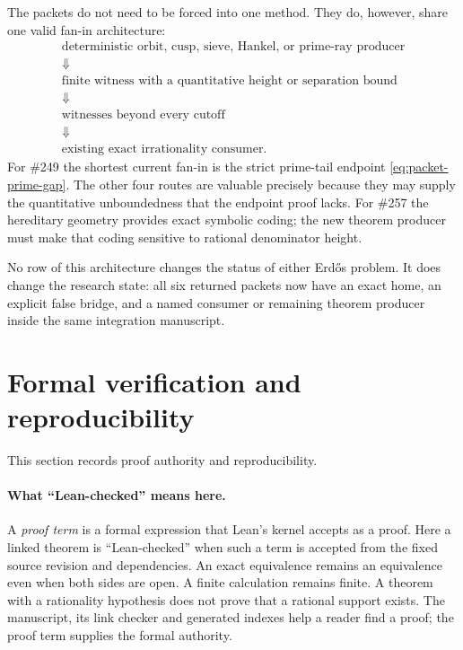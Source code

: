 \documentclass[11pt]{article}
\theoremstyle{definition}
\theoremstyle{remark}
\begin{document}
The packets do not need to be forced into one method.  They do, however, share
one valid fan-in architecture:
\[
 \begin{array}{c}
 \text{deterministic orbit, cusp, sieve, Hankel, or prime-ray producer}
 \\
 \Downarrow\\[-2pt]
 \text{finite witness with a quantitative height or separation bound}
 \\
 \Downarrow\\[-2pt]
 \text{witnesses beyond every cutoff}
 \\
 \Downarrow\\[-2pt]
 \text{existing exact irrationality consumer.}
 \end{array}
\]
For \#249 the shortest current fan-in is the strict prime-tail endpoint
\eqref{eq:packet-prime-gap}.  The other four routes are valuable precisely
because they may supply the quantitative unboundedness that the endpoint proof
lacks.  For \#257 the hereditary geometry provides exact symbolic coding; the
new theorem producer must make that coding sensitive to rational denominator
height.

No row of this architecture changes the status of either Erd\H{o}s problem.
It does change the research state: all six returned packets now have an exact
home, an explicit false bridge, and a named consumer or remaining theorem
producer inside the same integration manuscript.

\section{Formal verification and reproducibility}\label{sec:verify}

\noindent This section records proof authority and reproducibility.

\paragraph{What ``Lean-checked'' means here.}
A \emph{proof term} is a formal expression that Lean's kernel accepts as a
proof. Here a linked theorem is ``Lean-checked'' when such a term is accepted
from the fixed source revision and dependencies. An exact equivalence remains
an equivalence even when both sides are open. A finite calculation remains
finite. A theorem with a rationality hypothesis does not prove that a rational
support exists. The manuscript, its link checker and generated indexes help
a reader find a proof; the proof term supplies the formal authority.
\end{document}
